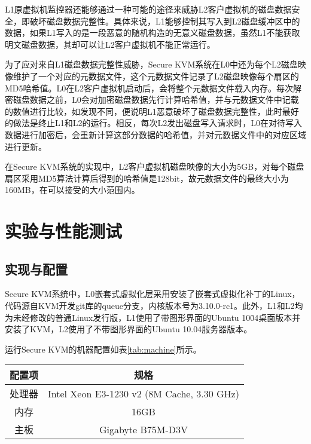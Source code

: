 L1原虚拟机监控器还能够通过一种可能的途径来威胁L2客户虚拟机的磁盘数据安全，即破坏磁盘数据完整性。具体来说，L1能够控制其写入到L2磁盘缓冲区中的数据，如果L1写入的是一段恶意的随机构造的无意义磁盘数据，虽然L1不能获取明文磁盘数据，其却可以让L2客户虚拟机不能正常运行。

为了应对来自L1磁盘数据完整性威胁，Secure KVM系统在L0中还为每个L2磁盘映像维护了一个对应的元数据文件，这个元数据文件记录了L2磁盘映像每个扇区的MD5哈希值。L0在L2客户虚拟机启动后，会将整个元数据文件载入内存。每次解密磁盘数据之前，L0会对加密磁盘数据先行计算哈希值，并与元数据文件中记载的数值进行比较，如发现不同，便说明L1恶意破坏了磁盘数据完整性，此时最好的做法是终止L1和L2的运行。相反，每次L2发出磁盘写入请求时，L0在对待写入数据进行加密后，会重新计算这部分数据的哈希值，并对元数据文件中的对应区域进行更新。

在Secure KVM系统的实现中，L2客户虚拟机磁盘映像的大小为5GB，对每个磁盘扇区采用MD5算法计算后得到的哈希值是128bit，故元数据文件的最终大小为160MB，在可以接受的大小范围内。

\section{实验与性能测试}

\subsection{实现与配置}

Secure KVM系统中，L0嵌套式虚拟化层采用安装了嵌套式虚拟化补丁的Linux，代码源自KVM开发git库的queue分支，内核版本号为3.10.0-rc1。此外，L1和L2均为未经修改的普通Linux发行版，L1使用了带图形界面的Ubuntu 10\.04桌面版本并安装了KVM，L2使用了不带图形界面的Ubuntu 10.04服务器版本。

运行Secure KVM的机器配置如表\ref{tab:machine}所示。

\begin{table}[htpb]
\centering
\begin{tabular}{cc}
\toprule
配置项	& 规格\\
\midrule
处理器	& Intel Xeon E3-1230 v2 (8M Cache, 3.30 GHz)\\
内存	& 16GB\\
主板	& Gigabyte B75M-D3V\\
\bottomrule
\end{tabular}
\end{table}

